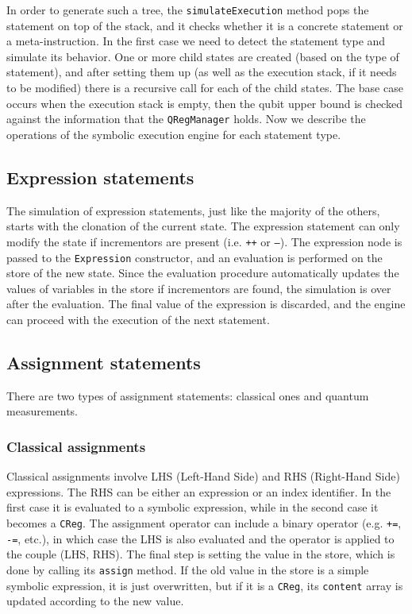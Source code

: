 \documentclass[12pt,a4paper]{report}
\theoremstyle{definition}
\theoremstyle{definition}
\theoremstyle{definition}
\begin{document}
In order to generate such a tree, the \texttt{simulateExecution} method pops the statement on top of the stack, and it checks whether it is a concrete statement or a meta-instruction. In the first case we need to detect the statement type and simulate its behavior. One or more child states are created (based on the type of statement), and after setting them up (as well as the execution stack, if it needs to be modified) there is a recursive call for each of the child states. The base case occurs when the execution stack is empty, then the qubit upper bound is checked against the information that the \texttt{QRegManager} holds.
Now we describe the operations of the symbolic execution engine for each statement type.

\subsection{Expression statements}
The simulation of expression statements, just like the majority of the others, starts with the clonation of the current state. The expression statement can only modify the state if incrementors are present (i.e. \texttt{++} or \texttt{--}). The expression node is passed to the \texttt{Expression} constructor, and an evaluation is performed on the store of the new state. Since the evaluation procedure automatically updates the values of variables in the store if incrementors are found, the simulation is over after the evaluation. The final value of the expression is discarded, and the engine can proceed with the execution of the next statement.
\subsection{Assignment statements}
There are two types of assignment statements: classical ones and quantum measurements.
\subsubsection{Classical assignments}
Classical assignments involve LHS (Left-Hand Side) and RHS (Right-Hand Side) expressions. The RHS can be either an expression or an index identifier. In the first case it is evaluated to a symbolic expression, while in the second case it becomes a \texttt{CReg}. The assignment operator can include a binary operator (e.g. \texttt{+=}, \texttt{-=}, etc.), in which case the LHS is also evaluated and the operator is applied to the couple (LHS, RHS).
The final step is setting the value in the store, which is done by calling its \texttt{assign} method. If the old value in the store is a simple symbolic expression, it is just overwritten, but if it is a \texttt{CReg}, its \texttt{content} array is updated according to the new value.
\end{document}
